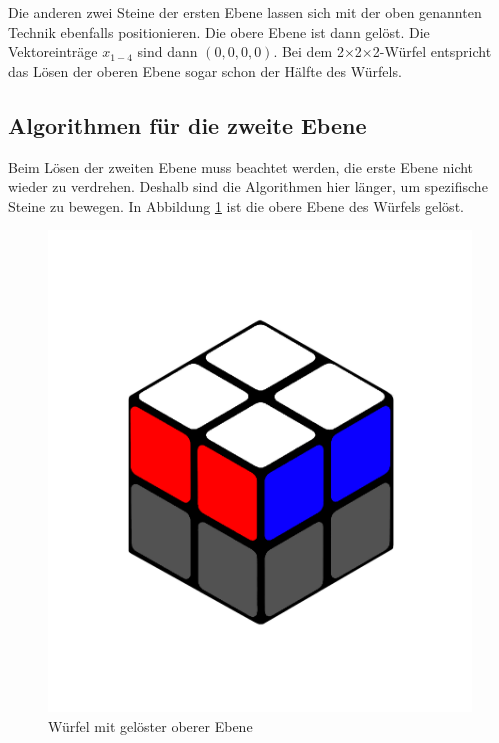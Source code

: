 \documentclass[12pt,a4paper, usenames, dvipsnames]{article}
\theoremstyle{mystyle}
\theoremstyle{definition}
\newcommand{\Ttwo}{2$\times$2$\times$2-}
\begin{document}
Die anderen zwei Steine der ersten Ebene lassen sich mit der oben genannten Technik ebenfalls positionieren. Die obere Ebene ist dann gelöst. Die Vektoreinträge $x_{1-4}$ sind dann $(0,0,0,0)$.
Bei dem \Ttwo Würfel entspricht das Lösen der oberen Ebene sogar schon der Hälfte des Würfels.



%
%
%
%
%
%
%
%
%
%
%
%
%
%
%
%
%
%
%
\subsection{Algorithmen für die zweite Ebene}
\label{Abschnitt_AlgorithmenZweiteEbene}

Beim Lösen der zweiten Ebene muss beachtet werden, die erste Ebene nicht wieder zu verdrehen. Deshalb sind die Algorithmen hier länger, um spezifische Steine zu bewegen.
In Abbildung \ref{Abbildung_GelösteObereEbene} ist die obere Ebene des Würfels gelöst. 

\begin{figure}[H]
\centering
\includegraphics[scale=0.1]{ebene.png}
\caption{Würfel mit gelöster oberer Ebene}
\label{Abbildung_GelösteObereEbene}
\end{figure}
\end{document}
